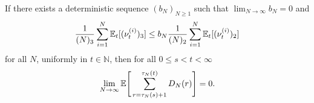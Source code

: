 


\begin{lemma} \label{lem:removeass2}
If there exists a deterministic sequence $(b_N)_{N\geq1}$ such that ${\lim}_{N\to\infty} b_N =0$ and
\begin{equation*}
\frac{1}{(N)_3} \sum_{i = 1}^N \mathbb{E}_t[ (\nu_t^{(i)})_3 ]  \leq b_N \frac{1}{(N)_2} \sum_{i = 1}^N \mathbb{E}_t[ (\nu_t^{(i)})_2 ]
\end{equation*}
for all $N$, uniformly in $t \in \mathbb{N}$,
then for all $0 \leq s < t < \infty$
\begin{equation*}
\lim_{ N \rightarrow \infty } \mathbb{E}\Bigg[ \sum_{ r = \tau_N( s ) + 1 }^{ \tau_N( t ) } D_N( r ) \Bigg] = 0 .
\end{equation*}
\end{lemma}

